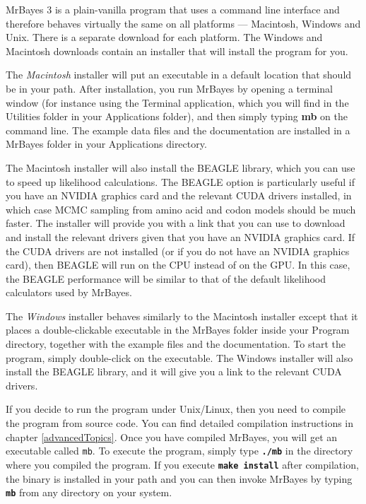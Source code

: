 \documentclass[12pt]{book}
\newcommand{\tb}[1]{\texttt{\textbf{#1}} }
\begin{document}
MrBayes 3 is a plain-vanilla program that uses a command line interface and therefore
behaves virtually the same on all platforms --- Macintosh, Windows and Unix. There is a
separate download for each platform. The Windows and Macintosh downloads contain
an installer that will install the program for you.

The \emph{Macintosh} installer will put an executable in a default location that should be in
your path. After installation, you run MrBayes by opening a terminal window (for instance using
the Terminal application, which you will find in the Utilities folder in your Applications folder), and then
simply typing \textbf{mb} on the command line. The example data files and the documentation are installed in a MrBayes folder in your Applications directory.

The Macintosh installer will also install the BEAGLE library, which you can use
to speed up likelihood calculations. The BEAGLE option is particularly useful if you have
an NVIDIA graphics card and the relevant CUDA drivers installed, in which case MCMC sampling
from amino acid and codon models should be much faster. The installer will provide you with a link
that you can use to download and install the relevant drivers given that you have an NVIDIA
graphics card. If the CUDA drivers are not installed (or if you do not have an NVIDIA graphics card),
then BEAGLE will run on the CPU instead of on the GPU. In this case, the
BEAGLE performance will be similar to that of the default likelihood calculators used by MrBayes.
 
The \emph{Windows} installer behaves similarly to the Macintosh installer except that it places a
double-clickable executable in the MrBayes folder inside your Program directory, together
with the example files and the documentation. To start the program, simply double-click on
the executable. The Windows installer will also install the BEAGLE library, and it will give you
a link to the relevant CUDA drivers.

If you decide to run the program under Unix/Linux, then you need to compile the
program from source code. You can find detailed compilation instructions in chapter 
\ref{advancedTopics}. Once you have compiled MrBayes, you will get an executable
called \texttt{mb}. To execute the program, simply type \tb{./mb} in the directory
where you compiled the program. If you execute \tb{make install} after compilation,
the binary is installed in your path and you can then invoke MrBayes by typing \tb{mb}
from any directory on your system.
\end{document}
